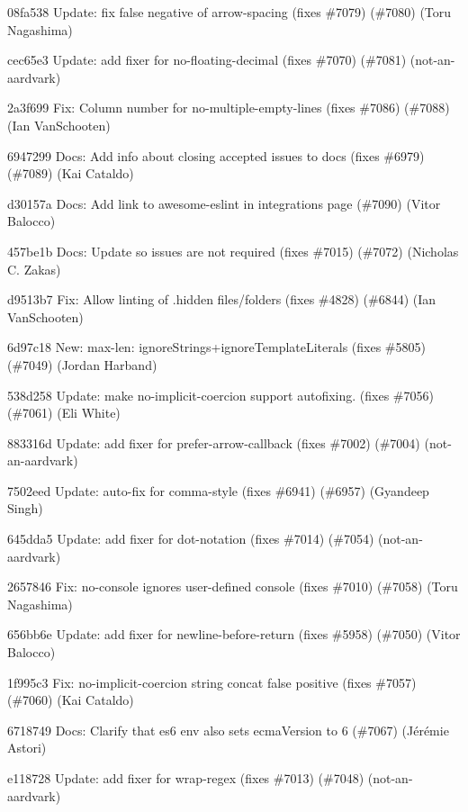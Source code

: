 \begin{DoxyItemize}
\item 08fa538 Update\+: fix false negative of {\ttfamily arrow-\/spacing} (fixes \#7079) (\#7080) (Toru Nagashima)
\item cec65e3 Update\+: add fixer for no-\/floating-\/decimal (fixes \#7070) (\#7081) (not-\/an-\/aardvark)
\item 2a3f699 Fix\+: Column number for no-\/multiple-\/empty-\/lines (fixes \#7086) (\#7088) (Ian Van\+Schooten)
\item 6947299 Docs\+: Add info about closing accepted issues to docs (fixes \#6979) (\#7089) (Kai Cataldo)
\item d30157a Docs\+: Add link to awesome-\/eslint in integrations page (\#7090) (Vitor Balocco)
\item 457be1b Docs\+: Update so issues are not required (fixes \#7015) (\#7072) (Nicholas C. Zakas)
\item d9513b7 Fix\+: Allow linting of .hidden files/folders (fixes \#4828) (\#6844) (Ian Van\+Schooten)
\item 6d97c18 New\+: {\ttfamily max-\/len}\+: {\ttfamily ignore\+Strings}+{\ttfamily ignore\+Template\+Literals} (fixes \#5805) (\#7049) (Jordan Harband)
\item 538d258 Update\+: make no-\/implicit-\/coercion support autofixing. (fixes \#7056) (\#7061) (Eli White)
\item 883316d Update\+: add fixer for prefer-\/arrow-\/callback (fixes \#7002) (\#7004) (not-\/an-\/aardvark)
\item 7502eed Update\+: auto-\/fix for {\ttfamily comma-\/style} (fixes \#6941) (\#6957) (Gyandeep Singh)
\item 645dda5 Update\+: add fixer for dot-\/notation (fixes \#7014) (\#7054) (not-\/an-\/aardvark)
\item 2657846 Fix\+: {\ttfamily no-\/console} ignores user-\/defined console (fixes \#7010) (\#7058) (Toru Nagashima)
\item 656bb6e Update\+: add fixer for newline-\/before-\/return (fixes \#5958) (\#7050) (Vitor Balocco)
\item 1f995c3 Fix\+: no-\/implicit-\/coercion string concat false positive (fixes \#7057) (\#7060) (Kai Cataldo)
\item 6718749 Docs\+: Clarify that {\ttfamily es6} env also sets {\ttfamily ecma\+Version} to 6 (\#7067) (Jérémie Astori)
\item e118728 Update\+: add fixer for wrap-\/regex (fixes \#7013) (\#7048) (not-\/an-\/aardvark)

\end{DoxyItemize}
